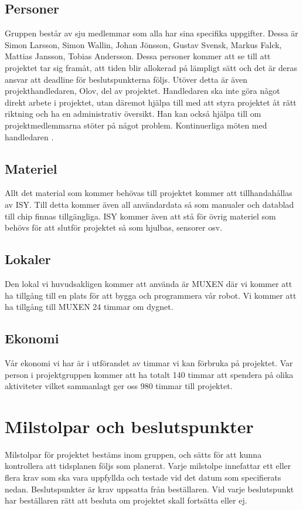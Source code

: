 \documentclass[a4paper,12pt]{article}
\begin{document}
\subsection{Personer}
Gruppen består av sju medlemmar som alla har sina specifika uppgifter. Dessa är Simon Larsson, Simon Wallin, Johan Jönsson, Gustav Svensk, Markus Falck, Mattias Jansson, Tobias Andersson. Dessa personer kommer att se till att projektet tar sig framåt, att tiden blir allokerad på lämpligt sätt och det är deras ansvar att deadline för beslutspunkterna följs. Utöver detta är även projekthandledaren, Olov, del av projektet. Handledaren ska inte göra något direkt arbete i projektet, utan däremot hjälpa till med att styra projektet åt rätt riktning och ha en administrativ översikt. Han kan också hjälpa till om projektmedlemmarna stöter på något problem. Kontinuerliga möten med handledaren .
\subsection{Materiel}
Allt det material som kommer behövas till projektet kommer att tillhandahållas av ISY. Till detta kommer även all användardata så som manualer och datablad till chip finnas tillgängliga. ISY kommer även att stå för övrig materiel som behövs för att slutför projektet så som hjulbas, sensorer osv.
\subsection{Lokaler}
Den lokal vi huvudsakligen kommer att använda är MUXEN där vi kommer att ha tillgång till en plats för att bygga och programmera vår robot. Vi kommer att ha tillgång till MUXEN 24 timmar om dygnet.
\subsection{Ekonomi}
Vår ekonomi vi har är i utförandet av timmar vi kan förbruka på projektet. Var person i projektgruppen kommer att ha totalt 140 timmar att spendera på olika aktiviteter vilket sammanlagt ger oss 980 timmar till projektet.


\section{ Milstolpar och beslutspunkter} %
Milstolpar för projektet bestäms inom gruppen, och sätts för att kunna kontrollera att tidsplanen följs som planerat. Varje milstolpe innefattar ett eller flera krav som ska vara uppfyllda och testade vid det datum som specifierats nedan. Beslutspunkter är krav uppsatta från beställaren. Vid varje beslutspunkt har beställaren rätt att besluta om projektet skall fortsätta eller ej.
\end{document}
